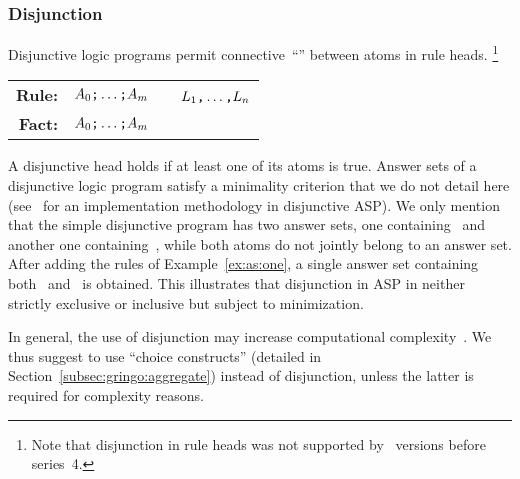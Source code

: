 \subsubsection{Disjunction}\label{subsec:gringo:disjunction}
Disjunctive logic programs permit connective~``\code{;}'' between atoms in rule heads.%
\footnote{Note that disjunction in rule heads was not supported by \clasp\ versions before series~4.}
\par
\medskip
\begin{tabular}{rl@{}l}\label{eq:disjunctive:rule}
\textbf{Rule:} & $A_0\text{\texttt{;}}\dots\text{\texttt{;}}A_m$&~\code{:-}~$L_1\text{\texttt{,}}\dots\text{\texttt{,}}L_n$\code{.}
\\
\textbf{Fact:} & $A_0\text{\texttt{;}}\dots\text{\texttt{;}}A_m$&\code{.}
\end{tabular}
%
%
\par
\medskip
\noindent
A disjunctive head holds if at least one of its atoms is true.
Answer sets of a disjunctive logic program satisfy a minimality criterion
that we do not detail here
(see~\cite{eitpol06a,gekasc11b} for an implementation methodology in disjunctive ASP).
We only mention that the simple disjunctive program  has two answer sets,
one containing~ and another one containing~,
while both atoms do not jointly belong to an answer set.
After adding the rules of Example~\ref{ex:as:one}, a single answer set containing both~ and~ is obtained.
This illustrates that disjunction in ASP in neither strictly exclusive or inclusive but subject to minimization.

In general, the use of disjunction may increase
computational complexity~\cite{eitgot95a}.
We thus suggest to use ``choice constructs'' (detailed in Section~\ref{subsec:gringo:aggregate})
instead of disjunction, unless the latter is required for complexity reasons.

